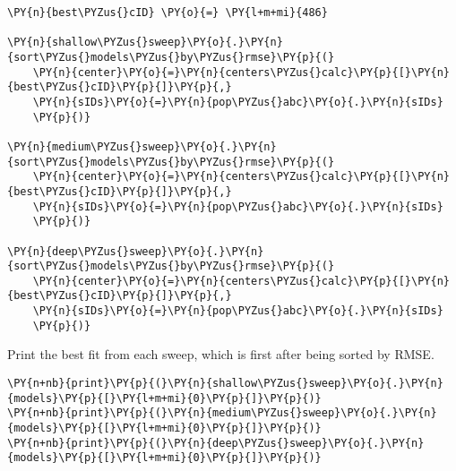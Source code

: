     \begin{tcolorbox}[breakable, size=fbox, boxrule=1pt, pad at break*=1mm,colback=cellbackground, colframe=cellborder]
\begin{Verbatim}[commandchars=\\\{\}]
\PY{n}{best\PYZus{}cID} \PY{o}{=} \PY{l+m+mi}{486}

\PY{n}{shallow\PYZus{}sweep}\PY{o}{.}\PY{n}{sort\PYZus{}models\PYZus{}by\PYZus{}rmse}\PY{p}{(}
    \PY{n}{center}\PY{o}{=}\PY{n}{centers\PYZus{}calc}\PY{p}{[}\PY{n}{best\PYZus{}cID}\PY{p}{]}\PY{p}{,}
    \PY{n}{sIDs}\PY{o}{=}\PY{n}{pop\PYZus{}abc}\PY{o}{.}\PY{n}{sIDs}
    \PY{p}{)}

\PY{n}{medium\PYZus{}sweep}\PY{o}{.}\PY{n}{sort\PYZus{}models\PYZus{}by\PYZus{}rmse}\PY{p}{(}
    \PY{n}{center}\PY{o}{=}\PY{n}{centers\PYZus{}calc}\PY{p}{[}\PY{n}{best\PYZus{}cID}\PY{p}{]}\PY{p}{,}
    \PY{n}{sIDs}\PY{o}{=}\PY{n}{pop\PYZus{}abc}\PY{o}{.}\PY{n}{sIDs}
    \PY{p}{)}

\PY{n}{deep\PYZus{}sweep}\PY{o}{.}\PY{n}{sort\PYZus{}models\PYZus{}by\PYZus{}rmse}\PY{p}{(}
    \PY{n}{center}\PY{o}{=}\PY{n}{centers\PYZus{}calc}\PY{p}{[}\PY{n}{best\PYZus{}cID}\PY{p}{]}\PY{p}{,}
    \PY{n}{sIDs}\PY{o}{=}\PY{n}{pop\PYZus{}abc}\PY{o}{.}\PY{n}{sIDs}
    \PY{p}{)}
\end{Verbatim}
\end{tcolorbox}

    Print the best fit from each sweep, which is first after being sorted by
RMSE.

    \begin{tcolorbox}[breakable, size=fbox, boxrule=1pt, pad at break*=1mm,colback=cellbackground, colframe=cellborder]
\begin{Verbatim}[commandchars=\\\{\}]
\PY{n+nb}{print}\PY{p}{(}\PY{n}{shallow\PYZus{}sweep}\PY{o}{.}\PY{n}{models}\PY{p}{[}\PY{l+m+mi}{0}\PY{p}{]}\PY{p}{)}
\PY{n+nb}{print}\PY{p}{(}\PY{n}{medium\PYZus{}sweep}\PY{o}{.}\PY{n}{models}\PY{p}{[}\PY{l+m+mi}{0}\PY{p}{]}\PY{p}{)}
\PY{n+nb}{print}\PY{p}{(}\PY{n}{deep\PYZus{}sweep}\PY{o}{.}\PY{n}{models}\PY{p}{[}\PY{l+m+mi}{0}\PY{p}{]}\PY{p}{)}
\end{Verbatim}
\end{tcolorbox}